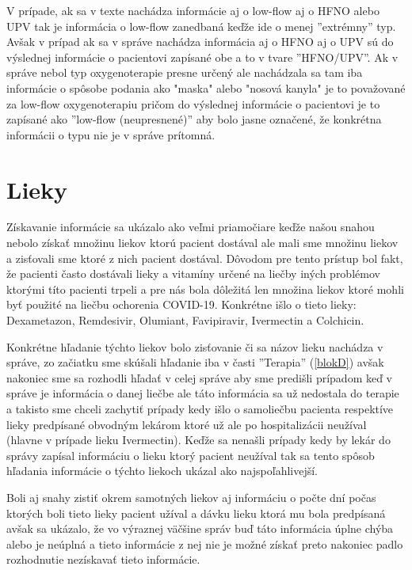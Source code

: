 V prípade, ak sa v texte nachádza informácie aj o low-flow aj o HFNO alebo UPV tak je informácia o low-flow zanedbaná keďže ide o menej ''extrémny'' typ. Avšak v prípad ak sa v správe nachádza informácia aj o HFNO aj o UPV sú do výslednej informácie o pacientovi zapísané obe a to v tvare ''HFNO/UPV''. Ak v správe nebol typ oxygenoterapie presne určený ale nachádzala sa tam iba informácie o spôsobe podania ako "maska" alebo "nosová kanyla" je to považované za low-flow oxygenoterapiu pričom do výslednej informácie o pacientovi je to zapísané ako ''low-flow (neupresnené)'' aby bolo jasne označené, že konkrétna informácii o typu nie je v správe prítomná.

\section{Lieky}

Získavanie informácie sa ukázalo ako veľmi priamočiare keďže našou snahou nebolo získať množinu liekov ktorú pacient dostával ale mali sme množinu liekov a zisťovali sme ktoré z nich pacient dostával. Dôvodom pre tento prístup bol fakt, že pacienti často dostávali lieky a vitamíny určené na liečby iných problémov ktorými títo pacienti trpeli a pre nás bola dôležitá len množina liekov ktoré mohli byť použité na liečbu ochorenia COVID-19. Konkrétne išlo o tieto lieky: Dexametazon, Remdesivir, Olumiant, Favipiravir, Ivermectin a Colchicin.

Konkrétne hľadanie týchto liekov bolo zisťovanie či sa názov lieku nachádza v správe, zo začiatku sme skúšali hľadanie iba v časti ''Terapia'' (\ref{blokD}) avšak nakoniec sme sa rozhodli hľadať v celej správe aby sme predišli prípadom keď v správe je informácia o danej liečbe ale táto informácia sa už nedostala do terapie a takisto sme chceli zachytiť prípady kedy išlo o samoliečbu pacienta respektíve lieky predpísané obvodným lekárom ktoré už ale po hospitalizácii neužíval (hlavne v prípade lieku Ivermectin). Keďže sa nenašli prípady kedy by lekár do správy zapísal informáciu o lieku ktorý pacient neužíval tak sa tento spôsob hľadania informácie o týchto liekoch ukázal ako najspoľahlivejší.
 
Boli aj snahy zistiť okrem samotných liekov aj informáciu o počte dní počas ktorých boli tieto lieky pacient užíval a dávku lieku ktorá mu bola predpísaná avšak sa ukázalo, že vo výraznej väčšine správ buď táto informácia úplne chýba alebo je neúplná a tieto informácie z nej nie je možné získať preto nakoniec padlo rozhodnutie nezískavať tieto informácie.

